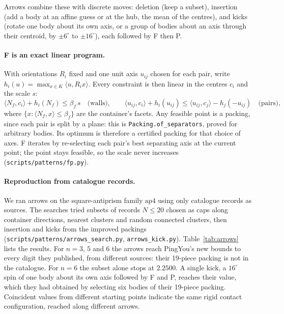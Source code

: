 \documentclass[11pt,a4paper]{article}
\newcommand{\code}[1]{\texttt{\nolinkurl{#1}}}
\newcommand{\lean}[1]{\texttt{#1}}
\theoremstyle{definition}
\theoremstyle{remark}
\begin{document}
Arrows combine these with discrete moves: deletion (keep a subset), insertion (add a body at an affine guess or at the hub, the mean of the centres), and kicks (rotate one body about its own axis, or a group of bodies about an axis through their centroid, by $\pm 6^\circ$ to $\pm 16^\circ$), each followed by F then P.

\paragraph{F is an exact linear program.} With orientations $R_i$ fixed and one unit axis $u_{ij}$ chosen for each pair, write $h_i(u)=\max_{x\in K}\langle u,R_i x\rangle$. Every constraint is then linear in the centres $c_i$ and the scale $s$:
\begin{equation}\label{eq:F}
\langle N_f,c_i\rangle+h_i(N_f)\le \beta_f\,s\quad\text{(walls)},\qquad
\langle u_{ij},c_i\rangle+h_i(u_{ij})\le \langle u_{ij},c_j\rangle-h_j(-u_{ij})\quad\text{(pairs)},
\end{equation}
where $\{x:\langle N_f,x\rangle\le\beta_f\}$ are the container's facets. Any feasible point is a packing, since each pair is split by a plane: this is \lean{Packing.of\_separators}, proved for arbitrary bodies. Its optimum is therefore a certified packing for that choice of axes. F iterates by re-selecting each pair's best separating axis at the current point; the point stays feasible, so the scale never increases (\code{scripts/patterns/fp.py}).

\paragraph{Reproduction from catalogue records.} We ran arrows on the square-antiprism family $\mathrm{ap4}$ using only catalogue records as sources. The searches tried subsets of records $N\le 20$ chosen as caps along container directions, nearest clusters and random connected clusters, then insertion and kicks from the improved packings (\code{scripts/patterns/arrows\_search.py}, \code{arrows\_kick.py}). Table~\ref{tab:arrows} lists the results. For $n=3$, $5$ and $6$ the arrows reach PingYou's new bounds to every digit they published, from different sources: their 19-piece packing is not in the catalogue. For $n=6$ the subset alone stops at $2.2500$. A single kick, a $16^\circ$ spin of one body about its own axis followed by F and P, reaches their value, which they had obtained by selecting six bodies of their 19-piece packing. Coincident values from different starting points indicate the same rigid contact configuration, reached along different arrows.
\end{document}
